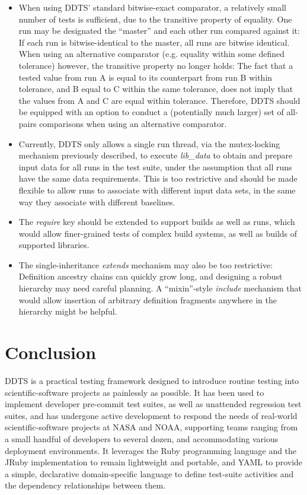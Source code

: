 \documentclass[conference]{IEEEtran}
\begin{document}
\begin{itemize}
\item When using DDTS' standard bitwise-exact comparator, a relatively small number of tests is sufficient, due to the transitive property of equality. One run may be designated the ``master'' and each other run compared against it: If each run is bitwise-identical to the master, all runs are bitwise identical. When using an alternative comparator (e.g. equality within some defined tolerance) however, the transitive property no longer holds: The fact that a tested value from run A is equal to its counterpart from run B within tolerance, and B equal to C within the same tolerance, does not imply that the values from A and C are equal within tolerance. Therefore, DDTS should be equipped with an option to conduct a (potentially much larger) set of all-pairs comparisons when using an alternative comparator.
\item Currently, DDTS only allows a single run thread, via the mutex-locking mechanism previously described, to execute \emph{lib\_data} to obtain and prepare input data for all runs in the test suite, under the assumption that all runs have the same data requirements. This is too restrictive and should be made flexible to allow runs to associate with different input data sets, in the same way they associate with different baselines.
\item The \emph{require} key should be extended to support builds as well as runs, which would allow finer-grained tests of complex build systems, as well as builds of supported libraries.
\item The single-inheritance \emph{extends} mechanism may also be too restrictive: Definition ancestry chains can quickly grow long, and designing a robust hierarchy may need careful planning. A ``mixin''-style \emph{include} mechanism that would allow insertion of arbitrary definition fragments anywhere in the hierarchy might be helpful.
\end{itemize}

\section{Conclusion}

DDTS is a practical testing framework designed to introduce routine testing into scientific-software projects as painlessly as possible. It has been used to implement developer pre-commit test suites, as well as unattended regression test suites, and has undergone active development to respond the needs of real-world scientific-software projects at NASA and NOAA, supporting teams ranging from a small handful of developers to several dozen, and accommodating various deployment environments. It leverages the Ruby programming language and the JRuby implementation to remain lightweight and portable, and YAML to provide a simple, declarative domain-specific language to define test-suite activities and the dependency relationships between them.
\end{document}
